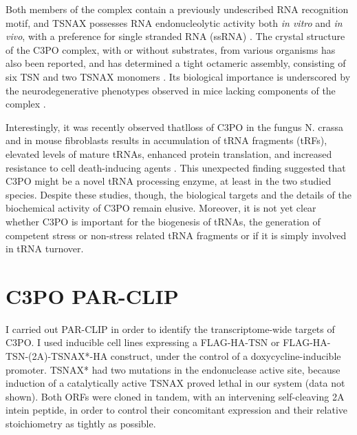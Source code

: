 \documentclass[12pt]{rockefeller}
\begin{document}
Both members of the complex contain a previously undescribed RNA recognition motif, and  TSNAX possesses RNA endonucleolytic activity both \textit{in vitro} and \textit{in vivo}, with a preference for single stranded RNA (ssRNA) \cite{Ye:2011bo, Tian:2011hx}. The crystal structure of the C3PO complex, with or without substrates, from various organisms has also been reported, and has determined a tight octameric assembly, consisting of six TSN and two TSNAX monomers \cite{Ye:2011bo, Tian:2011hx, Parizotto:2013dg}. Its biological importance is underscored by the neurodegenerative phenotypes observed in mice lacking components of the complex \cite{Stein:2006jj}. 

Interestingly, it was recently observed thatlloss of C3PO in the fungus  N. crassa and in mouse fibroblasts results in accumulation of tRNA fragments (tRFs), elevated levels of mature tRNAs, enhanced protein translation, and increased resistance to cell death-inducing agents \cite{Li:2012kob}. This unexpected finding suggested that C3PO might be a novel tRNA processing enzyme, at least in the two studied species. Despite these studies, though, the biological targets and the details of the biochemical activity of C3PO remain elusive. Moreover, it is not yet clear whether C3PO is important for the biogenesis of tRNAs, the generation of competent stress or non-stress related tRNA fragments or if it is simply involved in tRNA turnover.       

\chapter{C3PO PAR-CLIP}
I carried out PAR-CLIP in order to identify the transcriptome-wide targets of C3PO. I used inducible cell lines expressing a FLAG-HA-TSN or FLAG-HA-TSN-(2A)-TSNAX*-HA construct, under the control of a doxycycline-inducible promoter. \newline TSNAX* had two mutations in the endonuclease active site, because induction of a catalytically active TSNAX proved lethal in our system (data not shown). 	Both ORFs were cloned in tandem, with an intervening self-cleaving 2A intein peptide, in order to control their concomitant expression and their relative stoichiometry as tightly as possible.
\end{document}
